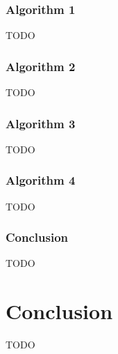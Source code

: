 \documentclass{sig-alternate-05-2015}
\begin{document}
\subsubsection{Algorithm 1}
TODO\\
\subsubsection{Algorithm 2}
TODO\\
\subsubsection{Algorithm 3}
TODO\\
\subsubsection{Algorithm 4}
TODO\\
\subsubsection{Conclusion}
TODO\\


\section{Conclusion}
TODO\\
\end{document}
